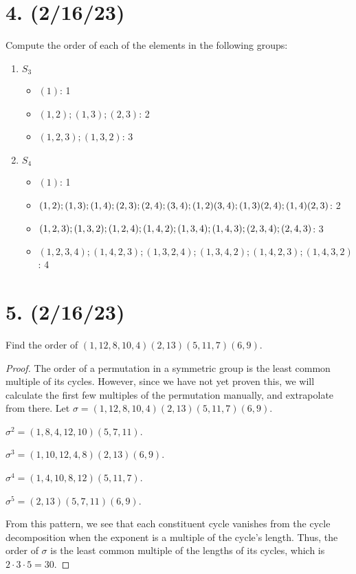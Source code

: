 \documentclass{article}
\begin{document}
\section*{4. (2/16/23)}

Compute the order of each of the elements in the following groups:

\begin{enumerate}[label=(\alph*)]
    \item $S_3$
        \begin{itemize}
            \item $(1)$: 1
            \item $(1, 2); (1, 3); (2, 3)$: 2
            \item $(1, 2, 3); (1, 3, 2)$: 3
        \end{itemize}
    \item $S_4$
        \begin{itemize}
            \item $(1)$: 1
            \item $(1, 2); (1, 3); (1, 4); (2, 3); (2, 4); (3, 4); (1, 2)(3, 4);\\(1, 3)(2, 4); (1, 4)(2, 3)$: 2
            \item $(1, 2, 3); (1, 3, 2); (1, 2, 4); (1, 4, 2); (1, 3, 4); (1, 4, 3);\\(2, 3, 4); (2, 4, 3)$: 3
            \item $(1, 2, 3, 4); (1, 4, 2, 3); (1, 3, 2, 4); (1, 3, 4, 2); (1, 4, 2, 3); (1, 4, 3, 2)$: 4
        \end{itemize}
\end{enumerate}

\section*{5. (2/16/23)}

Find the order of $(1, 12, 8, 10, 4)(2, 13)(5, 11, 7)(6, 9)$.

\begin{proof}
    The order of a permutation in a symmetric group is the least common multiple of its cycles. However, since we have not yet proven this, we will calculate the first few multiples of the permutation manually, and extrapolate from there. Let $\sigma = (1, 12, 8, 10, 4)(2, 13)(5, 11, 7)(6, 9)$.

    $\sigma^2 = (1, 8, 4, 12, 10)(5, 7, 11)$.

    $\sigma^3 = (1, 10, 12, 4, 8)(2, 13)(6, 9)$.

    $\sigma^4 = (1, 4, 10, 8, 12)(5, 11, 7)$.
    
    $\sigma^5 = (2, 13)(5, 7, 11)(6, 9)$.

    From this pattern, we see that each constituent cycle vanishes from the cycle decomposition when the exponent is a multiple of the cycle's length. Thus, the order of $\sigma$ is the least common multiple of the lengths of its cycles, which is $2 \cdot 3 \cdot 5 = 30$.
\end{proof}
\end{document}
